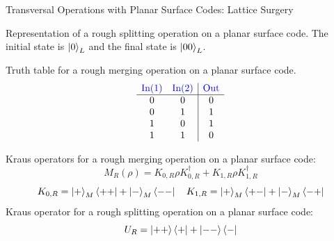 \documentclass{beamer}
\begin{document}
\begin{frame}{Transversal Operations with Planar Surface Codes: Lattice Surgery}
    \begin{figure}
        \centering
        
        \label{fig:surface_code_transversal}
    \end{figure}
    Representation of a rough splitting operation on a planar surface code. The initial state is $\ket{0}_L$ and the final state is $\ket{00}_L$.
    
\end{frame}

\begin{frame}
    \begin{figure}
        \centering
        
        \label{fig:surface_code_transversal}
    \end{figure}

Truth table for a rough merging operation on a planar surface code.    
\[
\begin{array}{cc|c}
\textcolor{blue}{\text{In}(1)} & \textcolor{blue}{\text{In}(2)} & \textcolor{blue}{\text{Out}} \\
\hline
0 & 0 & 0 \\
0 & 1 & 1 \\
1 & 0 & 1 \\
1 & 1 & 0 \\
\end{array}
\]
\end{frame}

\begin{frame}
Kraus operators for a rough merging operation on a planar surface code:
    \begin{equation*}
    M_R(\rho) = K_{0,R} \rho K_{0,R}^\dagger + K_{1,R} \rho K_{1,R}^\dagger 
    \end{equation*}
\begin{equation*}
K_{0,R} = \ket{+}_M \bra{++} + \ket{-}_M \bra{--} \quad K_{1,R} = \ket{+}_M \bra{+-} + \ket{-}_M \bra{-+}
\end{equation*}
Kraus operator for a rough splitting operation on a planar surface code:
\begin{equation*}
    U_R = \ket{++} \bra{+} + \ket{--} \bra{-}
\end{equation*}
\end{frame}
\end{document}
